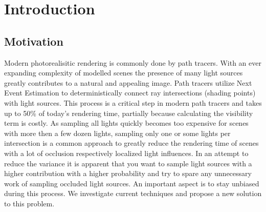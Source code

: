 \chapter{Introduction}
\label{ch:Introduction}

\section{Motivation}

Modern photorealisitic rendering is commonly done by path tracers. With an ever expanding complexity of modelled scenes the presence of many light sources greatly contributes to a natural and appealing image. Path tracers utilize Next Event Estimation to deterministically connect ray intersections (shading points) with light sources. This process is a critical step in modern path tracers and takes up to 50\% of today's rendering time, partially because calculating the visibility term is costly. As sampling all lights quickly becomes too expensive for scenes with more then a few dozen lights, sampling only one or some lights per intersection is a common approach to greatly reduce the rendering time of scenes with a lot of occlusion respectively localized light influences. In an attempt to reduce the variance it is apparent that you want to sample light sources with a higher contribution with a higher probability and try to spare any unnecessary work of sampling occluded light sources. An important aspect is to stay unbiased during this process. We investigate current techniques and propose a new solution to this problem.
